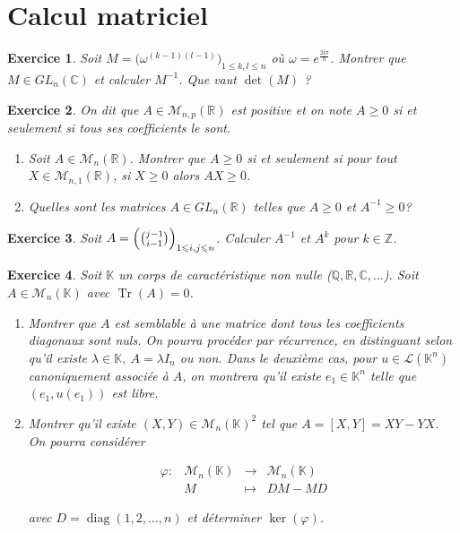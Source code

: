 \documentclass[12pt]{article}
\newtheorem{exercise}{Exercice}[section]
\theoremstyle{remark}
\theoremstyle{remark}
\newcommand{\K}{\mathbb{K}}
\newcommand{\R}{\mathbb{R}}
\newcommand{\C}{\mathbb{C}}
\newcommand{\Q}{\mathbb{Q}}
\newcommand{\Z}{\mathbb{Z}}
\newcommand{\M}{\mathcal{M}}
\renewcommand{\L}{\mathcal{L}}
\DeclareMathOperator{\diag}{diag}
\DeclareMathOperator{\Tr}{Tr}
\newcommand{\function}[5]{
	$$
	\begin{array}{rccl}
		#1: & #2 & \to & #3 \\
		& #4 & \mapsto & #5
	\end{array}
	$$
}
\begin{document}
\cleardoublepage
\section{Calcul matriciel}

\begin{exercise}
	Soit $M=\bigl(\omega^{(k-1)(l-1)}\bigr)_{1\leqslant k,l\leqslant n}$ où
	$\omega=e^{\frac{2\mathrm{i}\pi}{n}}$. Montrer que $M\in GL_{n}(\C)$ et
	calculer $M^{-1}$. Que vaut $\det(M)$ ?
\end{exercise}

\begin{exercise}
	On dit que $A\in\M_{n,p}(\R)$ est positive et on note $A\geqslant0$ si et
	seulement si tous ses coefficients le sont.
	\begin{enumerate}
		\item Soit $A\in\M_{n}(\R)$. Montrer que $A\geqslant0$ si et seulement
		si pour tout $X\in\M_{n,1}(\R)$, si $X\geqslant0$ alors $AX\geqslant0$.
		\item Quelles sont les matrices $A\in GL_{n}(\R)$ telles que
		$A\geqslant0$ et $A^{-1}\geqslant0$?
	\end{enumerate}
\end{exercise}

\begin{exercise}
	Soit $A=\Bigl(\binom{j-1}{i-1}\Bigr)_{1\leqslant i,j\leqslant n}$. Calculer
	$A^{-1}$ et $A^{k}$ pour $k\in\Z$.
\end{exercise}

\begin{exercise}
	Soit $\K$ un corps de caractéristique non nulle ($\Q,\R,\C,\dots$).
	Soit $A\in\M_{n}(\K)$ avec $\Tr(A)=0$.
	\begin{enumerate}
		\item Montrer que $A$ est semblable à une matrice dont tous les
		coefficients diagonaux sont nuls. On pourra procéder par récurrence, en
		distinguant selon qu'il existe $\lambda\in\K,~A=\lambda I_{n}$ ou non.
		Dans le deuxième cas, pour $u\in\L(\K^{n})$ canoniquement associée à
		$A$, on montrera qu'il existe $e_{1}\in\K^{n}$ telle que
		$(e_{1},u(e_{1}))$ est libre.
		\item Montrer qu'il existe $(X,Y)\in\M_{n}(\K)^{2}$ tel que
		$A=[X,Y]=XY-YX$. On pourra considérer
		\function{\varphi}{\M_{n}(\K)}{\M_{n}(\K)}{M}{DM-MD}
		avec $D=\diag(1,2,\dots,n)$ et déterminer $\ker(\varphi)$.
	\end{enumerate}
\end{exercise}
\end{document}
